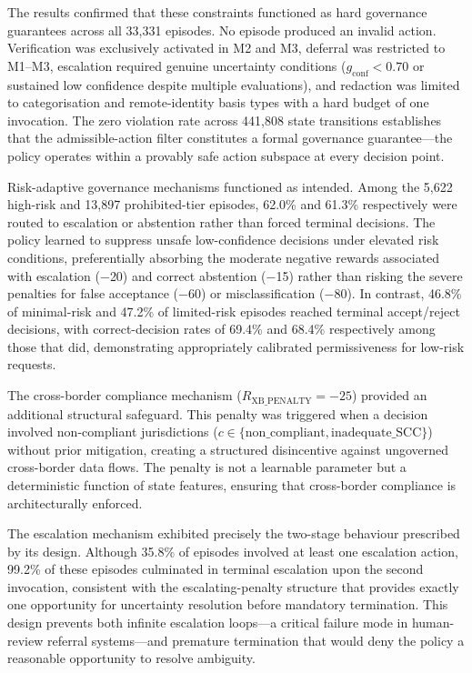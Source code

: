 \documentclass{article}
\begin{document}
The results confirmed that these constraints functioned as hard governance guarantees across all 33,331 episodes. No episode produced an invalid action. Verification was exclusively activated in M2 and M3, deferral was restricted to M1--M3, escalation required genuine uncertainty conditions ($g_{\mathrm{conf}} < 0.70$ or sustained low confidence despite multiple evaluations), and redaction was limited to categorisation and remote-identity basis types with a hard budget of one invocation. The zero violation rate across 441,808 state transitions establishes that the admissible-action filter constitutes a formal governance guarantee—the policy operates within a provably safe action subspace at every decision point.

Risk-adaptive governance mechanisms functioned as intended. Among the 5,622 high-risk and 13,897 prohibited-tier episodes, 62.0\% and 61.3\% respectively were routed to escalation or abstention rather than forced terminal decisions. The policy learned to suppress unsafe low-confidence decisions under elevated risk conditions, preferentially absorbing the moderate negative rewards associated with escalation ($-$20) and correct abstention ($-$15) rather than risking the severe penalties for false acceptance ($-$60) or misclassification ($-$80). In contrast, 46.8\% of minimal-risk and 47.2\% of limited-risk episodes reached terminal accept/reject decisions, with correct-decision rates of 69.4\% and 68.4\% respectively among those that did, demonstrating appropriately calibrated permissiveness for low-risk requests.

The cross-border compliance mechanism ($R_{\mathrm{XB\_PENALTY}} = -25$) provided an additional structural safeguard. This penalty was triggered when a decision involved non-compliant jurisdictions ($c \in \{\mathrm{non\_compliant}, \mathrm{inadequate\_SCC}\}$) without prior mitigation, creating a structured disincentive against ungoverned cross-border data flows. The penalty is not a learnable parameter but a deterministic function of state features, ensuring that cross-border compliance is architecturally enforced.

The escalation mechanism exhibited precisely the two-stage behaviour prescribed by its design. Although 35.8\% of episodes involved at least one escalation action, 99.2\% of these episodes culminated in terminal escalation upon the second invocation, consistent with the escalating-penalty structure that provides exactly one opportunity for uncertainty resolution before mandatory termination. This design prevents both infinite escalation loops—a critical failure mode in human-review referral systems—and premature termination that would deny the policy a reasonable opportunity to resolve ambiguity.
\end{document}
